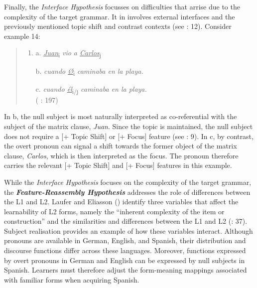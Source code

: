 \documentclass[
  letterpaper,
  DIV=11,
  numbers=noendperiod]{scrartcl}
\begin{document}
Finally, the \emph{Interface Hypothesis} focusses on difficulties that
arrise due to the complexity of the target grammar. It in involves
external interfaces and the previously mentioned topic shift and
contrast contexts (see :
12). Consider example 14:

\begin{quote}
\begin{enumerate}
\def\labelenumi{(\arabic{enumi})}
\setcounter{enumi}{13}
\item
  a. \ul{\emph{Juan}}\textsubscript{i} \emph{vio a
  \ul{Carlos}}\textsubscript{\ul{j}}

  b. \emph{cuando \ul{Ø}}\textsubscript{i} \emph{caminaba en la playa.}

  c. \emph{cuando \ul{él}}\textsubscript{i/j} \emph{caminaba en la
  playa.}\\
  ( : 197)
\end{enumerate}
\end{quote}

In b, the null subject is most naturally interpreted as co-referential
with the subject of the matrix clause, \emph{Juan}. Since the topic is
maintained, the null subject does not require a {[}+ Topic Shift{]} or
{[}+ Focus{]} feature (see : 9). In c, by contrast, the overt pronoun can signal a shift
towards the former object of the matrix clause, \emph{Carlos}, which is
then interpreted as the focus. The pronoun therefore carries the
relevant {[}+ Topic Shift{]} and {[}+ Focus{]} features in this example.

While the \emph{Interface Hypothesis} focuses on the complexity of the
target grammar, the \textbf{\emph{Feature-Reassembly Hypothesis}}
addresses the role of differences between the L1 and L2. Laufer and
Eliasson () identify three
variables that affect the learnability of L2 forms, namely the
``inherent complexity of the item or construction'' and the similarities
and differences between the L1 and L2
(: 37). Subject realisation
provides an example of how these variables interact. Although pronouns
are available in German, English, and Spanish, their distribution and
discourse functions differ across these languages. Moreover, functions
expressed by overt pronouns in German and English can be expressed by
null subjects in Spanish. Learners must therefore adjust the
form-meaning mappings associated with familiar forms when acquiring
Spanish.
\end{document}
